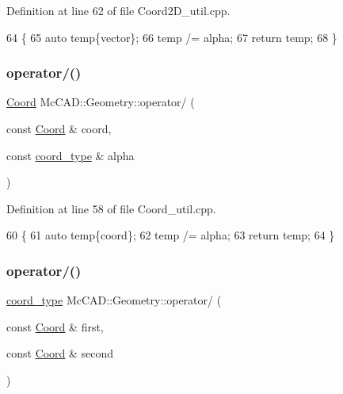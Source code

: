 Definition at line 62 of file Coord2\+D\+\_\+util.\+cpp.


\begin{DoxyCode}
64                                 \{
65     \textcolor{keyword}{auto} temp\{vector\};
66     temp /= alpha;
67     \textcolor{keywordflow}{return} temp;
68 \}
\end{DoxyCode}
\mbox{\label{namespaceMcCAD_1_1Geometry_a65f77e3a81b85aaa6563fbefe4adeacf}} 
\subsubsection{\texorpdfstring{operator/()}{operator/()}\hspace{0.1cm}{\footnotesize\ttfamily [3/4]}}
{\footnotesize\ttfamily \hyperlink{classMcCAD_1_1Geometry_1_1Coord}{Coord} Mc\+C\+A\+D\+::\+Geometry\+::operator/ (\begin{DoxyParamCaption}\item[{const \hyperlink{classMcCAD_1_1Geometry_1_1Coord}{Coord} \&}]{coord,  }\item[{const \hyperlink{namespaceMcCAD_1_1Geometry_ac043b37a4a7e849fca22869e1982d2f8}{coord\+\_\+type} \&}]{alpha }\end{DoxyParamCaption})}



Definition at line 58 of file Coord\+\_\+util.\+cpp.


\begin{DoxyCode}
60                                 \{
61     \textcolor{keyword}{auto} temp\{coord\};
62     temp /= alpha;
63     \textcolor{keywordflow}{return} temp;
64 \}
\end{DoxyCode}
\mbox{\label{namespaceMcCAD_1_1Geometry_a14f251c8557210a2779de77ca7411059}} 
\subsubsection{\texorpdfstring{operator/()}{operator/()}\hspace{0.1cm}{\footnotesize\ttfamily [4/4]}}
{\footnotesize\ttfamily \hyperlink{namespaceMcCAD_1_1Geometry_ac043b37a4a7e849fca22869e1982d2f8}{coord\+\_\+type} Mc\+C\+A\+D\+::\+Geometry\+::operator/ (\begin{DoxyParamCaption}\item[{const \hyperlink{classMcCAD_1_1Geometry_1_1Coord}{Coord} \&}]{first,  }\item[{const \hyperlink{classMcCAD_1_1Geometry_1_1Coord}{Coord} \&}]{second }\end{DoxyParamCaption})}



